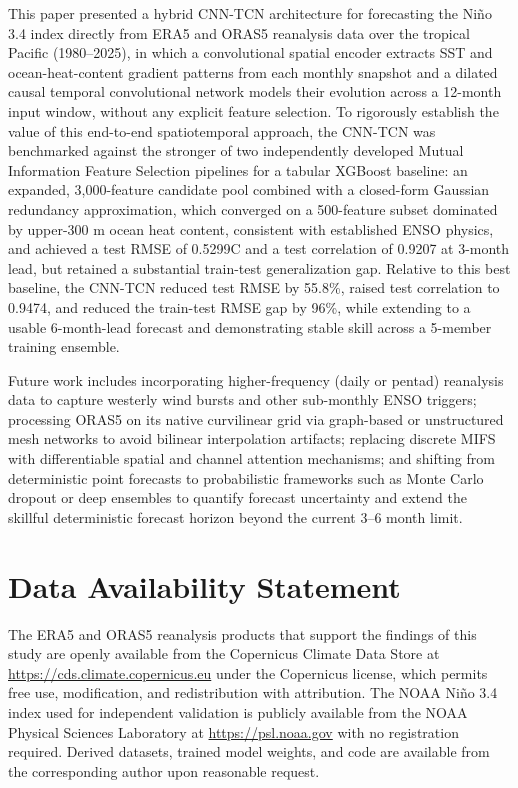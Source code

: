 \documentclass[conference]{IEEEtran}
\begin{document}
This paper presented a hybrid CNN-TCN architecture for forecasting the Ni\~no 3.4 index directly from ERA5 and ORAS5 reanalysis data over the tropical Pacific (1980--2025), in which a convolutional spatial encoder extracts SST and ocean-heat-content gradient patterns from each monthly snapshot and a dilated causal temporal convolutional network models their evolution across a 12-month input window, without any explicit feature selection. To rigorously establish the value of this end-to-end spatiotemporal approach, the CNN-TCN was benchmarked against the stronger of two independently developed Mutual Information Feature Selection pipelines for a tabular XGBoost baseline: an expanded, 3,000-feature candidate pool combined with a closed-form Gaussian redundancy approximation, which converged on a 500-feature subset dominated by upper-300 m ocean heat content, consistent with established ENSO physics, and achieved a test RMSE of 0.5299\textdegree C and a test correlation of 0.9207 at 3-month lead, but retained a substantial train-test generalization gap. Relative to this best baseline, the CNN-TCN reduced test RMSE by 55.8\%, raised test correlation to 0.9474, and reduced the train-test RMSE gap by 96\%, while extending to a usable 6-month-lead forecast and demonstrating stable skill across a 5-member training ensemble.

Future work includes incorporating higher-frequency (daily or pentad) reanalysis data to capture westerly wind bursts and other sub-monthly ENSO triggers; processing ORAS5 on its native curvilinear grid via graph-based or unstructured mesh networks to avoid bilinear interpolation artifacts; replacing discrete MIFS with differentiable spatial and channel attention mechanisms; and shifting from deterministic point forecasts to probabilistic frameworks such as Monte Carlo dropout or deep ensembles to quantify forecast uncertainty and extend the skillful deterministic forecast horizon beyond the current 3--6 month limit.

\section*{Data Availability Statement}
The ERA5 and ORAS5 reanalysis products that support the findings of this study are openly available from the Copernicus Climate Data Store at \url{https://cds.climate.copernicus.eu} under the Copernicus license, which permits free use, modification, and redistribution with attribution. The NOAA Ni\~no 3.4 index used for independent validation is publicly available from the NOAA Physical Sciences Laboratory at \url{https://psl.noaa.gov} with no registration required. Derived datasets, trained model weights, and code are available from the corresponding author upon reasonable request.
\end{document}
